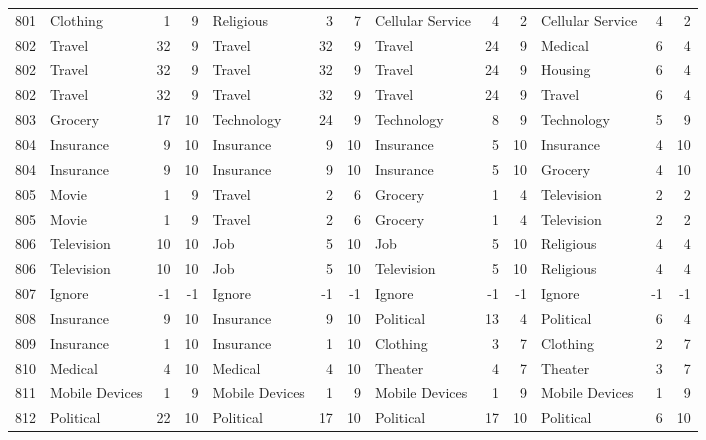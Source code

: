 \begin{figure}[htbp]
\begin{tabular}{rlrrlrrlrrlrr}
    801   & Clothing & 1     & 9     & Religious & 3     & 7     & Cellular Service & 4     & 2     & Cellular Service & 4     & 2 \\
    802   & Travel & 32    & 9     & Travel & 32    & 9     & Travel & 24    & 9     & Medical & 6     & 4 \\
    802   & Travel & 32    & 9     & Travel & 32    & 9     & Travel & 24    & 9     & Housing & 6     & 4 \\
    802   & Travel & 32    & 9     & Travel & 32    & 9     & Travel & 24    & 9     & Travel & 6     & 4 \\
    803   & Grocery & 17    & 10    & Technology & 24    & 9     & Technology & 8     & 9     & Technology & 5     & 9 \\
    804   & Insurance & 9     & 10    & Insurance & 9     & 10    & Insurance & 5     & 10    & Insurance & 4     & 10 \\
    804   & Insurance & 9     & 10    & Insurance & 9     & 10    & Insurance & 5     & 10    & Grocery & 4     & 10 \\
    805   & Movie & 1     & 9     & Travel & 2     & 6     & Grocery & 1     & 4     & Television & 2     & 2 \\
    805   & Movie & 1     & 9     & Travel & 2     & 6     & Grocery & 1     & 4     & Television & 2     & 2 \\
    806   & Television & 10    & 10    & Job   & 5     & 10    & Job   & 5     & 10    & Religious & 4     & 4 \\
    806   & Television & 10    & 10    & Job   & 5     & 10    & Television & 5     & 10    & Religious & 4     & 4 \\
    807   & Ignore & -1    & -1    & Ignore & -1    & -1    & Ignore & -1    & -1    & Ignore & -1    & -1 \\
    808   & Insurance & 9     & 10    & Insurance & 9     & 10    & Political & 13    & 4     & Political & 6     & 4 \\
    809   & Insurance & 1     & 10    & Insurance & 1     & 10    & Clothing & 3     & 7     & Clothing & 2     & 7 \\
    810   & Medical & 4     & 10    & Medical & 4     & 10    & Theater & 4     & 7     & Theater & 3     & 7 \\
    811   & Mobile Devices & 1     & 9     & Mobile Devices & 1     & 9     & Mobile Devices & 1     & 9     & Mobile Devices & 1     & 9 \\
    812   & Political & 22    & 10    & Political & 17    & 10    & Political & 17    & 10    & Political & 6     & 10 \\

\end{tabular}
\end{figure}
